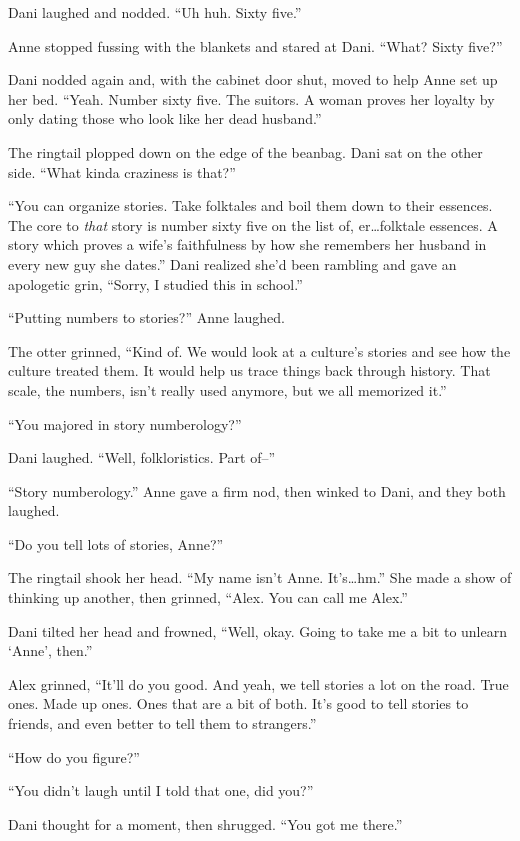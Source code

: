 Dani laughed and nodded. ``Uh huh. Sixty five.''

Anne stopped fussing with the blankets and stared at Dani. ``What? Sixty five?''

Dani nodded again and, with the cabinet door shut, moved to help Anne set up her bed. ``Yeah. Number sixty five. The suitors. A woman proves her loyalty by only dating those who look like her dead husband.''

The ringtail plopped down on the edge of the beanbag. Dani sat on the other side. ``What kinda craziness is that?''

``You can organize stories. Take folktales and boil them down to their essences. The core to \emph{that} story is number sixty five on the list of, er\ldots{}folktale essences. A story which proves a wife's faithfulness by how she remembers her husband in every new guy she dates.'' Dani realized she'd been rambling and gave an apologetic grin, ``Sorry, I studied this in school.''

``Putting numbers to stories?'' Anne laughed.

The otter grinned, ``Kind of. We would look at a culture's stories and see how the culture treated them. It would help us trace things back through history. That scale, the numbers, isn't really used anymore, but we all memorized it.''

``You majored in story numberology?''

Dani laughed. ``Well, folkloristics. Part of--''

``Story numberology.'' Anne gave a firm nod, then winked to Dani, and they both laughed.

``Do you tell lots of stories, Anne?''

The ringtail shook her head. ``My name isn't Anne. It's\ldots{}hm.'' She made a show of thinking up another, then grinned, ``Alex. You can call me Alex.''

Dani tilted her head and frowned, ``Well, okay. Going to take me a bit to unlearn `Anne', then.''

Alex grinned, ``It'll do you good. And yeah, we tell stories a lot on the road. True ones. Made up ones. Ones that are a bit of both. It's good to tell stories to friends, and even better to tell them to strangers.''

``How do you figure?''

``You didn't laugh until I told that one, did you?''

Dani thought for a moment, then shrugged. ``You got me there.''

